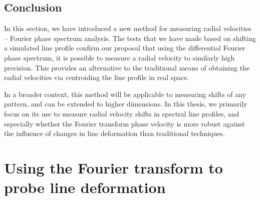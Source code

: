 %
%


\subsection{Conclusion}
In this section, we have introduced a new method for measuring radial velocities -- Fourier phase spectrum analysis. The tests that we have made based on shifting a simulated line profile confirm our proposal that using the differential Fourier phase spectrum, it is possible to measure a radial velocity to similarly high precision. This provides an alternative to the traditional means of obtaining the radial velocities via centroiding the line profile in real space. 

In a broader context, this method will be applicable to measuring shifts of any pattern, and can be extended to higher dimensions. In this thesis, we primarily focus on its use to measure radial velocity shifts in spectral line profiles, and especially whether the Fourier transform phase velocity is more robust against the influence of changes in line deformation than traditional techniques.

\pagebreak

\section{Using the Fourier transform to probe line deformation}
\label{\thesection}
\label{sec:FT_ld}

